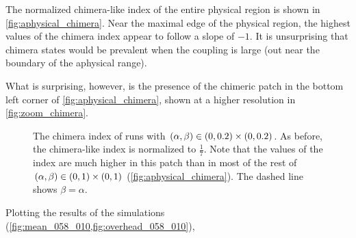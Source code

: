 The normalized chimera-like index of the entire physical region is shown in \cref{fig:aphysical_chimera}.
Near the maximal edge of the physical region, the highest values of the chimera index appear to follow a slope of $-1$.
It is unsurprising that chimera states would be prevalent when the coupling is large (out near the boundary of the aphysical range).

What is surprising, however, is the presence of the chimeric patch in the bottom left corner of \cref{fig:aphysical_chimera}, shown at a higher resolution in \cref{fig:zoom_chimera}.
\begin{figure}[ht]
  \centering
   \hfill
  \caption[Zoomed landscape]{The chimera index of runs with $(\alpha, \beta) \in (0, 0.2) \times (0, 0.2)$.
    As before, the chimera-like index is normalized to $\frac{1}{7}$.
    Note that the values of the index are much higher in this patch than in most of the rest of $(\alpha, \beta) \in (0, 1) \times (0, 1)$ (\cref{fig:aphysical_chimera}).
    The dashed line shows $\beta = \alpha$.
  }
\end{figure}
Plotting the results of the simulations (\cref{fig:mean_058_010,fig:overhead_058_010}),
